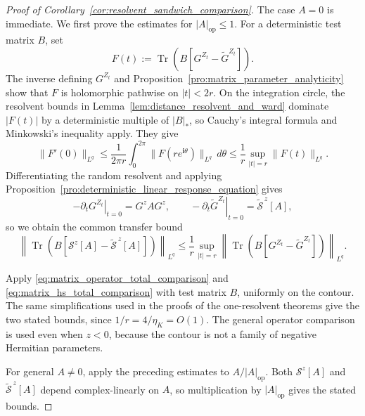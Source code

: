 \documentclass[EJP, preprint, NODS, nobera, nofontexpansion]{ejpecp}
\newcommand{\ii}{\mathbf{i}}
\DeclareMathOperator{\op}{op}
\DeclareMathOperator{\tr}{Tr}
\begin{document}
\begin{proof}[Proof of
Corollary~\ref{cor:resolvent_sandwich_comparison}]
The case $A=0$ is immediate. We first prove the estimates for
$|A|_{\op}\leq1$.
For a deterministic test matrix \(B\), set
\[
 F(t):=\tr\!\left(B[G^{Z_t}-\widetilde G^{Z_t}]\right).
\]
The inverse defining $G^{Z_t}$ and
Proposition~\ref{pro:matrix_parameter_analyticity} show that $F$ is
holomorphic pathwise on $|t|<2r$. On the integration circle, the resolvent
bounds in Lemma~\ref{lem:distance_resolvent_and_ward} dominate $|F(t)|$ by a deterministic multiple of
$|B|_*$, so Cauchy's integral formula and Minkowski's inequality apply.  They give
\[
 \|F'(0)\|_{L^q}
 \leq\frac1{2\pi r}\int_0^{2\pi}
       \|F(re^{\ii\theta})\|_{L^q}\,d\theta
 \leq\frac1r\sup_{|t|=r}\|F(t)\|_{L^q}.
\]
Differentiating the random resolvent and applying
Proposition~\ref{pro:deterministic_linear_response_equation} gives
\[
 -\left.\partial_tG^{Z_t}\right|_{t=0}=G^zAG^z,
 \qquad
 -\left.\partial_t\widetilde G^{Z_t}\right|_{t=0}
 =\widetilde{\mathcal S}^{\,z}[A],
\]
so we obtain the common transfer bound
\begin{equation}
 \left\|\tr\!\left(
 B[\mathcal S^z[A]-\widetilde{\mathcal S}^{\,z}[A]]
 \right)\right\|_{L^q}
    \leq\frac1r\sup_{|t|=r}
 \left\|\tr\!\left(B[G^{Z_t}-\widetilde G^{Z_t}]\right)\right\|_{L^q}.
\end{equation}

Apply \eqref{eq:matrix_operator_total_comparison} and
\eqref{eq:matrix_hs_total_comparison} with test matrix $B$, uniformly on
the contour. The same simplifications used in the
proofs of the one-resolvent theorems give the two stated bounds, since
$1/r=4/\eta_K=O(1)$. The general operator comparison is used even when
$z<0$, because the contour is not a family of negative Hermitian
parameters.

For general $A\neq0$, apply the preceding estimates to
$A/|A|_{\op}$. Both $\mathcal S^z[A]$ and
$\widetilde{\mathcal S}^{\,z}[A]$ depend complex-linearly on $A$, so multiplication
by $|A|_{\op}$ gives the stated bounds.

\end{proof}
\end{document}
